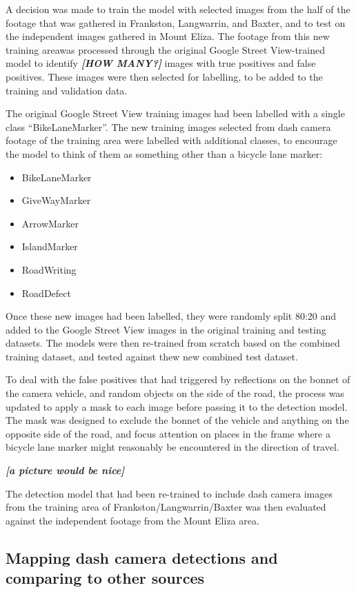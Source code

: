 \documentclass[11pt,twoside]{report}
\newcommand{\remark}[1]{{\bf \em [\marginpar{$\Leftarrow$}#1]}}
\begin{document}
A decision was made to train the model with selected images from the half of the footage that was gathered in Frankston, Langwarrin, and Baxter, and to test on the independent images gathered in Mount Eliza.  The footage from this new training areawas processed through the original Google Street View-trained model to identify \remark{HOW MANY?} images with true positives and false positives.  These images were then selected for labelling, to be added to the training and validation data.

The original Google Street View training images had been labelled with a single class ``BikeLaneMarker''.  The new training images selected from dash camera footage of the training area were labelled with additional classes, to encourage the model to think of them as something other than a bicycle lane marker:

\begin{itemize}
\item{BikeLaneMarker}
\item{GiveWayMarker}
\item{ArrowMarker}
\item{IslandMarker}
\item{RoadWriting}
\item{RoadDefect}
\end{itemize}

Once these new images had been labelled, they were randomly split 80:20 and added to the Google Street View images in the original training and testing datasets.  The models were then re-trained from scratch based on the combined training dataset, and tested against thew new combined test dataset.

To deal with the false positives that had triggered by reflections on the bonnet of the camera vehicle, and random objects on the side of the road, the process was updated to apply a mask to each image before passing it to the detection model.  The mask was designed to exclude the bonnet of the vehicle and anything on the opposite side of the road, and focus attention on places in the frame where a bicycle lane marker might reasonably be encountered in the direction of travel.

\remark{a picture would be nice}

The detection model that had been re-trained to include dash camera images from the training area of Frankston/Langwarrin/Baxter was then evaluated against the independent footage from the Mount Eliza area.


\subsection{Mapping dash camera detections and comparing to other sources}
\label{s:rq3d}
\end{document}
